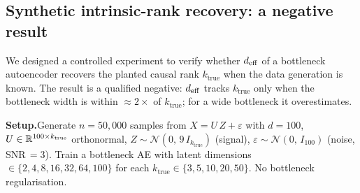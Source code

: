 \subsection{Synthetic intrinsic-rank recovery: a negative result}
\label{sec:synthetic-domain}

We designed a controlled experiment to verify whether $d_{\mathrm{eff}}$ of a bottleneck
autoencoder recovers the planted causal rank $k_{\mathrm{true}}$ when the data
generation is known.  The result is a qualified negative: $d_{\mathrm{eff}}$ tracks
$k_{\mathrm{true}}$ only when the bottleneck width is within $\approx 2\times$
of $k_{\mathrm{true}}$; for a wide bottleneck it overestimates.

\textbf{Setup.}\quad Generate $n{=}50{,}000$ samples from
$X = U\,Z + \varepsilon$ with $d=100$, $U \in \mathbb{R}^{100\times k_{\mathrm{true}}}$
orthonormal, $Z \sim \mathcal{N}(0,\, 9\,I_{k_{\mathrm{true}}})$ (signal),
$\varepsilon \sim \mathcal{N}(0,\, I_{100})$ (noise, SNR\,$=3$).
Train a bottleneck AE with latent dimensions
$\in \{2, 4, 8, 16, 32, 64, 100\}$ for each $k_{\mathrm{true}} \in \{3, 5, 10, 20, 50\}$.
No bottleneck regularisation.

